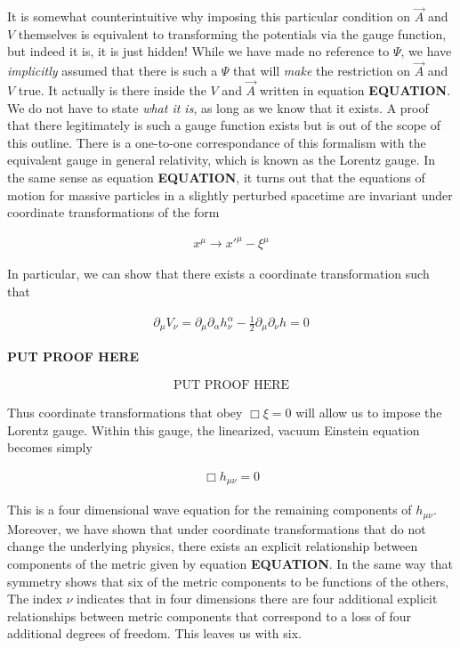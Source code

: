 \documentclass[paper=a4, fontsize=11pt]{scrartcl} %
\numberwithin{equation}{section} %
\numberwithin{figure}{section} %
\numberwithin{table}{section} %
\begin{document}
It is somewhat counterintuitive why imposing this particular condition on $\vec{A}$ and $V$ themselves is equivalent to transforming the potentials via the gauge function, but indeed it is, it is just hidden! While we have made no reference to $\Psi$, we have \textit{implicitly} assumed that there is such a $\Psi$ that will \textit{make} the restriction on $\vec{A}$ and $V$ true. It actually is there inside the $V$ and $\vec{A}$ written in equation \textbf{EQUATION}. We do not have to state \textit{what it is}, as long as we know that it exists. A proof that there legitimately is such a gauge function exists but is out of the scope of this outline. 
There is a one-to-one correspondance of this formalism with the equivalent gauge in general relativity, which is known as the Lorentz gauge. In the same sense as equation \textbf{EQUATION}, it turns out that the equations of motion for massive particles in a slightly perturbed spacetime are invariant under coordinate transformations of the form  

\begin{align}
x^{\mu} \rightarrow x'^{\mu} - \xi^{\mu}
\end{align}

In particular, we can show that there exists a coordinate transformation such that 

\begin{align}
\partial_{\mu}V_{\nu} = \partial_{\mu}\partial_{\alpha}h^{\alpha}_{\nu} - \frac{1}{2}\partial_{\mu}\partial_{\nu}h = 0
\end{align} 

\textbf{PUT PROOF HERE}

\begin{align}
\text{PUT PROOF HERE}
\end{align}

Thus coordinate transformations that obey $\Box \xi = 0$ will allow us to impose the Lorentz gauge. Within this gauge, the linearized, vacuum Einstein equation becomes simply

\begin{align}\label{eq:flteinst}
\Box h_{\mu \nu} = 0
\end{align}

This is a four dimensional wave equation for the remaining components of $h_{\mu \nu}$. Moreover, we have shown that under coordinate transformations that do not change the underlying physics, there exists an explicit relationship between components of the metric given by equation \textbf{EQUATION}. In the same way that symmetry shows that six of the metric components to be functions of the others, The index $\nu$ indicates that in four dimensions there are four additional explicit relationships between metric components that correspond to a loss of four additional degrees of freedom. This leaves us with six.  
\end{document}
